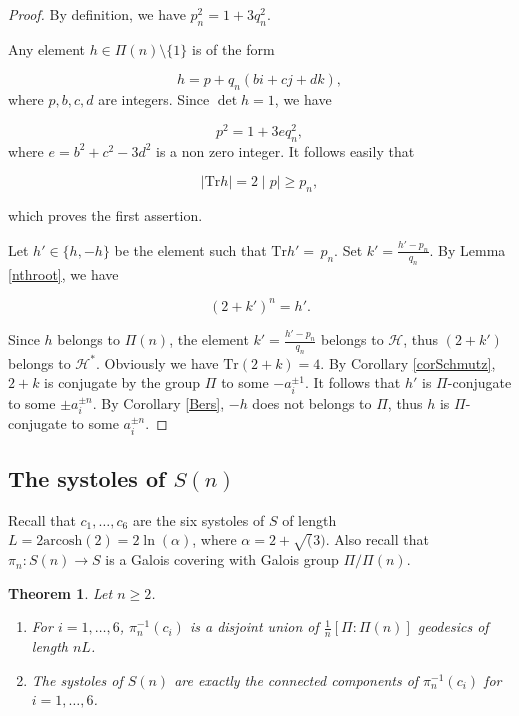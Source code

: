 \documentclass[10pt,a4paper]{amsart}
\newcommand{\arcosh}{\mathrm{arcosh}}
\newcommand{\Tr}{{\mathrm {Tr}}}
\newtheorem{thm}[lemma]{Theorem}
\newcommand{\cH}{\mathcal{H}}
\begin{document}
\begin{proof} By definition, we have 
$p_n^2=1+3q_n^2$.

Any element $h\in \Pi(n)\setminus\{1\}$ is of the form

$$h=p+q_n (bi+cj+dk),$$ 
where $p, b, c, d$ are integers.
Since $\det h=1$, we have

$$p^2=1+3eq_n^2,$$ 
where $e=b^2+c^2-3d^2$ is a non zero integer. It follows easily that 

$$\mid\Tr h\mid= 2\mid p\mid \geq p_n,$$

which proves the first assertion.

Let $h'\in\{h,-h\}$ be the element such that
$\Tr h'=\,p_n$. Set $k'=\frac{h'-p_n}{q_n}$.
By Lemma \ref{nthroot}, we have

$$(2+k')^n=h'.$$ 

\noindent Since $h$ belongs to $\Pi(n)$, the element
$k'=\frac{h'-p_n}{q_n}$ belongs to $\cH$, thus
$(2+k')$ belongs to $\cH^*$. Obviously
we have $\Tr(2+k)=4$. By Corollary \ref{corSchmutz},
$2+k$ is conjugate by the group $\Pi$ to  
some $-a_i^{\pm1}$. It follows that
$h'$ is $\Pi$-conjugate to some 
$\pm a_i^{\pm n}$. By Corollary \ref{Bers},
 $-h$ does not belongs to $\Pi$, thus 
 $h$ is $\Pi$-conjugate to some 
$a_i^{\pm n}$.
\end{proof}

\subsection{The systoles of $S(n)$}

Recall that $c_1,\ldots, c_6$ are the six systoles of $S$ of length $L=2\arcosh(2)=2\ln(\alpha)$, where
$\alpha=2+\sqrt(3)$.  Also recall that $\pi_n:S(n)\to S$ is a Galois covering with Galois group $\Pi/\Pi(n)$. 


\begin{thm}\label{systolesSn} Let $n\geq 2$.
\begin{enumerate}
\item[(a)] For $i=1,\ldots, 6$,  
$\pi_n^{-1}(c_i)$ is a disjoint union of 
$\frac{1}{n} [\Pi:\Pi(n)]$ geodesics of length
$nL$.
\item[(b)] The systoles of $S(n)$ are exactly the
connected components of $\pi_n^{-1}(c_i)$ for
$i=1,\ldots,6$.
 \end{enumerate}
\end{thm} 
\end{document}
